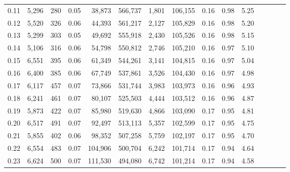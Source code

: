 \begin{tabular}{rrrcrrrrrrrrrrr}
0.11 &   5,296 &    280 &                                       0.05 &   38,873 &  566,737 &    1,801 &  106,155 &  0.16 &  0.98 &                         5.25 \\
0.12 &   5,520 &    326 &                                       0.06 &   44,393 &  561,217 &    2,127 &  105,829 &  0.16 &  0.98 &                         5.20 \\
0.13 &   5,299 &    303 &                                       0.05 &   49,692 &  555,918 &    2,430 &  105,526 &  0.16 &  0.98 &                         5.15 \\
0.14 &   5,106 &    316 &                                       0.06 &   54,798 &  550,812 &    2,746 &  105,210 &  0.16 &  0.97 &                         5.10 \\
0.15 &   6,551 &    395 &                                       0.06 &   61,349 &  544,261 &    3,141 &  104,815 &  0.16 &  0.97 &                         5.04 \\
0.16 &   6,400 &    385 &                                       0.06 &   67,749 &  537,861 &    3,526 &  104,430 &  0.16 &  0.97 &                         4.98 \\
0.17 &   6,117 &    457 &                                       0.07 &   73,866 &  531,744 &    3,983 &  103,973 &  0.16 &  0.96 &                         4.93 \\
0.18 &   6,241 &    461 &                                       0.07 &   80,107 &  525,503 &    4,444 &  103,512 &  0.16 &  0.96 &                         4.87 \\
0.19 &   5,873 &    422 &                                       0.07 &   85,980 &  519,630 &    4,866 &  103,090 &  0.17 &  0.95 &                         4.81 \\
0.20 &   6,517 &    491 &                                       0.07 &   92,497 &  513,113 &    5,357 &  102,599 &  0.17 &  0.95 &                         4.75 \\
0.21 &   5,855 &    402 &                                       0.06 &   98,352 &  507,258 &    5,759 &  102,197 &  0.17 &  0.95 &                         4.70 \\
0.22 &   6,554 &    483 &                                       0.07 &  104,906 &  500,704 &    6,242 &  101,714 &  0.17 &  0.94 &                         4.64 \\
0.23 &   6,624 &    500 &                                       0.07 &  111,530 &  494,080 &    6,742 &  101,214 &  0.17 &  0.94 &                         4.58 \\

\end{tabular}
